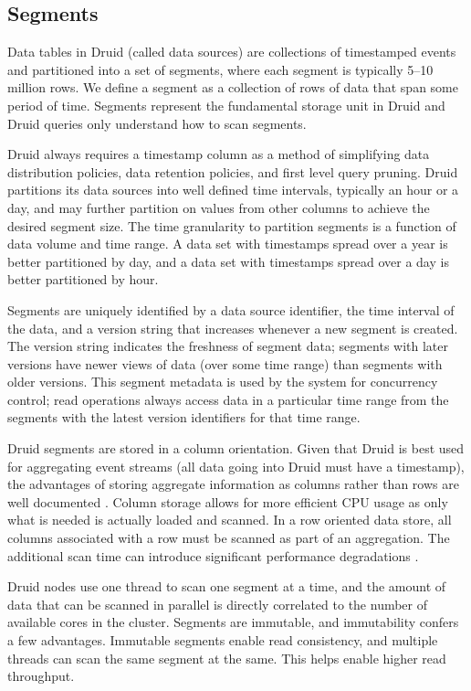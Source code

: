 \documentclass{vldb}
\begin{document}
\subsection{Segments}
\label{sec:segments}
Data tables in Druid (called data sources) are collections of timestamped
events and partitioned into a set of segments, where each segment is typically
5–10 million rows. We define a segment as a collection of rows of data that
span some period of time. Segments represent the fundamental storage unit in
Druid and Druid queries only understand how to scan segments. 

Druid always requires a timestamp column as a method of simplifying data
distribution policies, data retention policies, and first level query pruning.
Druid partitions its data sources into well defined time intervals, typically
an hour or a day, and may further partition on values from other columns to
achieve the desired segment size. The time granularity to partition segments is
a function of data volume and time range. A data set with timestamps spread
over a year is better partitioned by day, and a data set with timestamps spread
over a day is better partitioned by hour. 

Segments are uniquely identified by a data source identifier, the time interval
of the data, and a version string that increases whenever a new segment is
created. The version string indicates the freshness of segment data; segments
with later versions have newer views of data (over some time range) than
segments with older versions. This segment metadata is used by the system for
concurrency control; read operations always access data in a particular time
range from the segments with the latest version identifiers for that time
range.

Druid segments are stored in a column orientation. Given that Druid is best
used for aggregating event streams (all data going into Druid must have a
timestamp), the advantages of storing aggregate information as columns rather
than rows are well documented \cite{abadi2008column}. Column storage allows for
more efficient CPU usage as only what is needed is actually loaded and scanned.
In a row oriented data store, all columns associated with a row must be scanned
as part of an aggregation. The additional scan time can introduce significant
performance degradations \cite{abadi2008column}.

Druid nodes use one thread to scan one segment at a time, and the amount of
data that can be scanned in parallel is directly correlated to the number of
available cores in the cluster. Segments are immutable, and immutability
confers a few advantages. Immutable segments enable read consistency, and
multiple threads can scan the same segment at the same. This helps enable
higher read throughput. 
\end{document}
